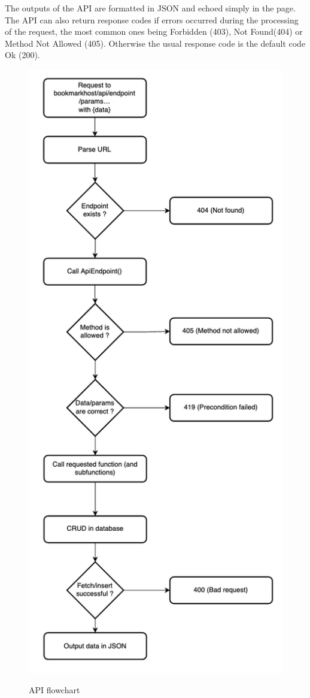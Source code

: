 \documentclass[conference]{IEEEtran}
\begin{document}
The outputs of the API are formatted in JSON and echoed simply in the page. The API can also return response codes if errors occurred during the processing of the request, the most common ones being Forbidden (403), Not Found(404) or Method Not Allowed (405). Otherwise the usual response code is the default code Ok (200).

\begin{center}
\begin{figure}[h]
    \includegraphics[height=1.8\columnwidth]{Resources/Architecture/API Module.png}\\
    \caption{API flowchart}
    \label{fig:apiFlowchart}
\end{figure}


\end{center}
\end{document}
